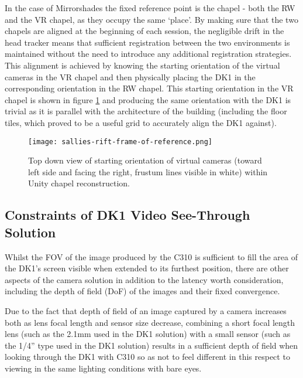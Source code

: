 In the case of Mirrorshades the fixed reference point is the chapel - both the RW and the VR chapel, as they occupy the same `place'. By making sure that the two chapels are aligned at the beginning of each session, the negligible drift in the head tracker means that sufficient registration between the two environments is maintained without the need to introduce any additional registration strategies. This alignment is achieved by knowing the starting orientation of the virtual cameras in the VR chapel and then physically placing the DK1 in the corresponding orientation in the RW chapel. This starting orientation in the VR chapel is shown in figure \ref{sallies-rift-frame-of-reference.png} and producing the same orientation with the DK1 is trivial as it is parallel with the architecture of the building (including the floor tiles, which proved to be a useful grid to accurately align the DK1 against).

\begin{figure}
	\begin{center}
		\texttt{[image: sallies-rift-frame-of-reference.png]}
		\caption{Top down view of starting orientation of virtual cameras (toward left side and facing the right, frustum lines visible in white) within Unity chapel reconstruction.}
		\label{sallies-rift-frame-of-reference.png}
	\end{center}
\end{figure}


\subsection{Constraints of DK1 Video See-Through Solution}

\label{constraints_of_dk1_see_through_solution}

Whilst the FOV of the image produced by the C310 is sufficient to fill the area of the DK1's screen visible when extended to its furthest position, there are other aspects of the camera solution in addition to the latency worth consideration, including the depth of field (DoF) of the images and their fixed convergence.

Due to the fact that depth of field of an image captured by a camera increases both as lens focal length and sensor size decrease, combining a short focal length lens (such as the 2.1mm used in the DK1 solution) with a small sensor (such as the 1/4'' type used in the DK1 solution) results in a sufficient depth of field when looking through the DK1 with C310 so as not to feel different in this respect to viewing in the same lighting conditions with bare eyes.

